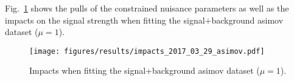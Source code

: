 Fig.~\ref{fig:impactsasimov} shows the pulls of the constrained nuisance parameters as well as the impacts on the signal
strength when fitting the signal$+$background asimov dataset ($\mu=1$).

\begin{figure}[h!]
\centering
\texttt{[image: figures/results/impacts\_2017\_03\_29\_asimov.pdf]}
	\caption{Impacts when fitting the signal+background asimov
         dataset ($\mu=1$). 
	\label{fig:impactsasimov}}
 \end{figure}
